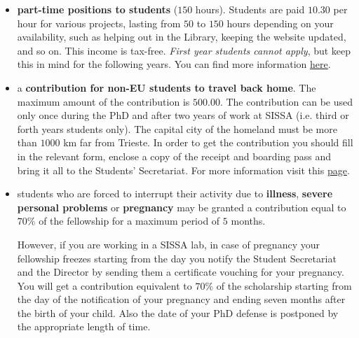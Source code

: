 \documentclass{sissavademecum}
\begin{document}
\begin{itemize}
    \item \textbf{part-time positions to students }($150$ hours). Students are paid  \EUR{} $10.30$ per hour for various projects, lasting from $50$ to $150$ hours depending on your availability, such as helping out in the Library, keeping the website updated, and so on. This income is tax-free. \textit{First year students cannot apply}, but keep this in mind for the following years. You can find more information \href{http://wiki.sissa.it/students/index.php/150_hours}{here}.
    \item a\textbf{ contribution for non-EU students to travel back home}. The maximum amount of the contribution is \EUR{} $500.00$. The contribution can be used only once during the PhD and after two years of work at SISSA (i.e. third or forth years students only). The capital city of the homeland must be more than $1000$ km far from Trieste. In order to get the contribution you should fill in the relevant form, enclose a copy of the receipt and boarding pass and bring it all to the Students' Secretariat. For more information visit this \href{http://wiki.sissa.it/students/index.php/Travel_grant_contribution}{page}.
    \item students who are forced to interrupt their activity due to \textbf{illness}, \textbf{severe personal problems} or \textbf{pregnancy} may be granted a contribution equal to $70\%$ of the fellowship for a maximum period of $5$ months.
    
    However, if you are working in a SISSA lab, in case of pregnancy your fellowship freezes starting from the day you notify the Student Secretariat and the Director by sending them a certificate vouching for your pregnancy. You will get a contribution equivalent to $70\%$ of the scholarship starting from the day of the notification of your pregnancy and ending seven months after the birth of your child. Also the date of your PhD defense is postponed by the appropriate length of time.
    

\end{itemize}
\end{document}
